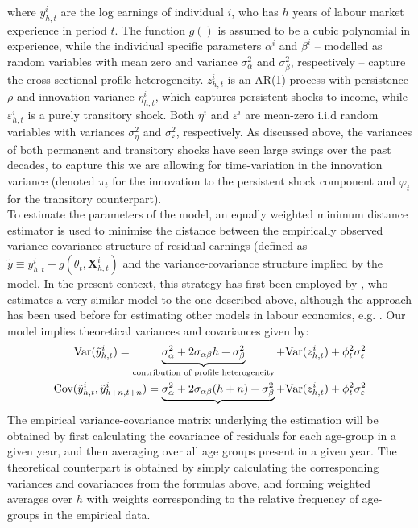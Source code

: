 where $y_{h,t}^i$ are the log earnings of individual $i$, who has $h$ years of
labour market experience in period $t$. The function $g()$ is assumed to be 
a cubic polynomial in experience, while the individual specific parameters 
$\alpha^i$ and $\beta^i$ -- modelled as random variables with mean zero and 
variance $\sigma^2_{\alpha}$ and $\sigma^2_{\beta}$, respectively --
 capture the cross-sectional profile heterogeneity. 
$z_{h,t}^i$ is an AR(1) process with persistence $\rho$ and innovation variance
$\eta_{h,t}^i$, which captures persistent shocks to income, while
$\varepsilon_{h,t}^i$ is a purely transitory shock. Both $\eta^i$ and 
$\varepsilon^i$ are mean-zero i.i.d random variables with variances 
$\sigma^2_{\eta}$ and $\sigma^2_{\varepsilon}$, respectively. As discussed 
above, the variances of both permanent and transitory shocks have seen large
swings over the past decades, to capture this we are allowing for time-variation
in the innovation variance (denoted $\pi_t$ for the innovation to the persistent
shock component and $\varphi_t$ for the transitory counterpart). \\
To estimate the parameters of the model, an equally weighted minimum distance 
estimator is used to minimise the distance between the empirically observed 
variance-covariance structure of residual earnings (defined as $\tilde{y} \equiv 
y_{h,t}^i - g(\theta_t, \pmb{X}_{h,t}^i)$ and the variance-covariance 
structure implied by the model. In the present context, this strategy has first 
been employed by \citet{Baker98}, who estimates a very similar model to the one
 described above, although the approach has been used before for estimating 
other models in labour economics, e.g. \citet{AbowdCard89}. Our model implies 
theoretical variances and covariances given by:
\begin{align}
\mbox{Var}(\tilde{y}_{h,t}^i) = \underbrace{\sigma^2_{\alpha} + 2 \sigma_{\alpha \beta} h + \sigma^2_{\beta}}_{\text{contribution of profile heterogeneity}} + \mbox{Var}(z^i_{h,t}) + \phi_t^2 \sigma^2_{\varepsilon} \\
\mbox{Cov}(\tilde{y}_{h,t}^i, \tilde{y}_{h+n,t+n}^i) = \underbrace{\sigma^2_{\alpha} + 2 \sigma_{\alpha \beta} (h+n) + \sigma^2_{\beta}} + \mbox{Var}(z^i_{h,t}) + \phi_t^2 \sigma^2_{\varepsilon}
\end{align}
The empirical variance-covariance matrix underlying the estimation will be 
obtained by first calculating the covariance of residuals for each age-group
in a given year, and then averaging over all age groups present in a given year.
The theoretical counterpart is obtained by simply calculating the corresponding
variances and covariances from the formulas above, and forming weighted averages
over $h$ with weights corresponding to the relative frequency of age-groups in 
the empirical data. 

